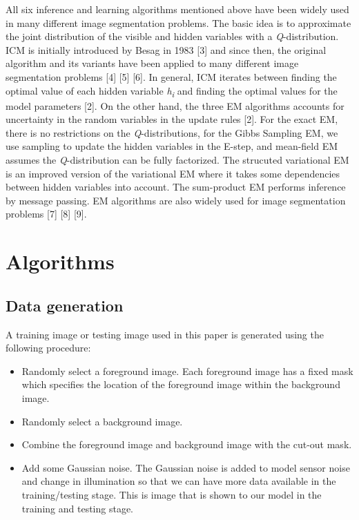 \documentclass{article} %
\begin{document}
All six inference and learning algorithms mentioned above have been widely used in many different image segmentation problems. The basic idea is to approximate the joint distribution of the visible and hidden variables with a \textit{Q}-distribution. ICM is initially introduced by Besag in 1983 [3] and since then, the original algorithm and its variants have been applied to many different image segmentation problems [4] [5] [6]. In general, ICM iterates between finding the optimal value of each hidden variable \textit{h}\textsubscript{\textit{i}} and finding the optimal values for the model parameters [2]. On the other hand, the three EM algorithms accounts for uncertainty in the random variables in the update rules [2]. For the exact EM, there is no restrictions on the \textit{Q}-distributions, for the Gibbs Sampling EM, we use sampling to update the hidden variables in the E-step, and mean-field EM assumes the \textit{Q}-distribution can be fully factorized. The strucuted variational EM is an improved version of the variational EM where it takes some dependencies between hidden variables into account. The sum-product EM performs inference by message passing. EM algorithms are also widely used for image segmentation problems [7] [8] [9].

\section{Algorithms}
\label{alog}
\subsection{Data generation}
\label{data_gen}
A training image or testing image used in this paper is generated using the following procedure:
\begin{itemize}

\item Randomly select a foreground image. Each foreground image has a fixed mask which specifies the location of the foreground image within the background image.

\item Randomly select a background image.

\item Combine the foreground image and background image with the cut-out mask.

\item Add some Gaussian noise. The Gaussian noise is added to model sensor noise and change in illumination so that we can have more data available in the training/testing stage. This is image that is shown to our model in the training and testing stage.
\end{itemize}
\end{document}
